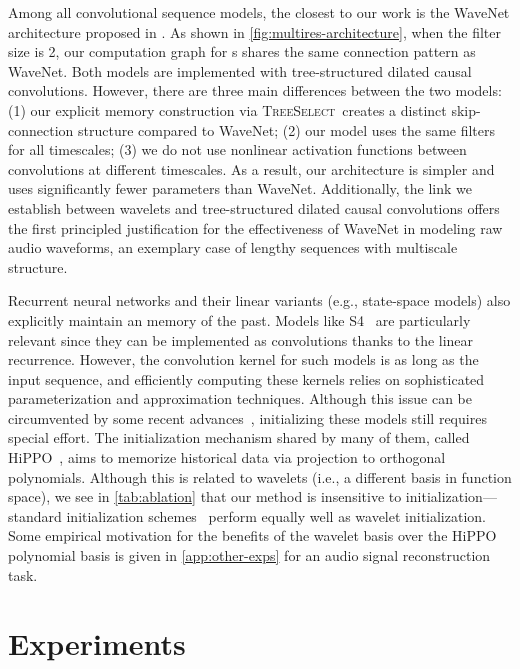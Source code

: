 \documentclass{article}
\theoremstyle{plain}
\theoremstyle{definition}
\theoremstyle{remark}
\newcommand{\treeselect}{\textsc{TreeSelect}}
\begin{document}
Among all convolutional sequence models, the closest to our work is the WaveNet architecture proposed in \citet{oord2016wavenet}. 
As shown in \cref{fig:multires-architecture}, when the filter size is 2, our computation graph for s shares the same connection pattern as WaveNet. 
Both models are implemented with tree-structured dilated causal convolutions. 
However, there are three main differences between the two models: (1) our explicit memory construction via \treeselect\ creates a distinct skip-connection structure compared to WaveNet; (2) our model uses the same filters for all timescales; (3) we do not use nonlinear activation functions between convolutions at different timescales. 
As a result, our architecture is simpler and uses significantly fewer parameters than WaveNet. 
Additionally, the link we establish between wavelets and tree-structured dilated causal convolutions offers the first principled justification for the effectiveness of WaveNet in modeling raw audio waveforms, an exemplary case of lengthy sequences with multiscale structure. 

Recurrent neural networks and their linear variants (e.g., state-space models) also explicitly maintain an memory of the past.  
Models like S4~\citep{gu2021efficiently} are particularly relevant since they can be implemented as convolutions thanks to the linear recurrence. 
However, the convolution kernel for such models is as long as the input sequence, and efficiently computing these kernels relies on sophisticated parameterization and approximation techniques.
Although this issue can be circumvented by some recent advances~\citep{gupta2022diagonal,guparameterization,smith2022simplified}, initializing these models still requires special effort. 
The initialization mechanism shared by many of them, called HiPPO~\citep{gu2020hippo}, aims to memorize historical data via projection to orthogonal polynomials. 
Although this is related to  wavelets (i.e., a different basis in function space), we see in \cref{tab:ablation} that our method is insensitive to initialization---standard initialization schemes~\citep{glorot2010understanding} perform equally well as wavelet initialization. Some empirical motivation for the benefits of the wavelet basis over the HiPPO polynomial basis is given in \cref{app:other-exps} for an audio signal reconstruction task.





\section{Experiments}
\end{document}
